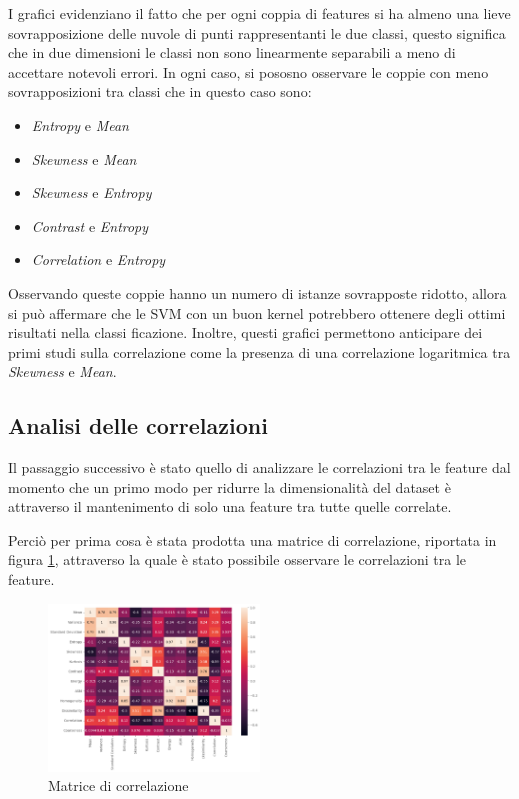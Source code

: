 I grafici evidenziano il fatto che per ogni coppia di features si ha almeno una lieve sovrapposizione
delle nuvole di punti rappresentanti le due classi, questo significa che in due 
dimensioni le classi non sono linearmente separabili a meno di accettare notevoli 
errori. In ogni caso, si pososno osservare le coppie con meno sovrapposizioni tra classi 
che in questo caso sono:
\begin{itemize}
      \item \textit{Entropy} e \textit{Mean}  
      \item \textit{Skewness} e \textit{Mean}  
      \item \textit{Skewness} e \textit{Entropy}  
      \item \textit{Contrast} e \textit{Entropy}  
      \item \textit{Correlation} e \textit{Entropy}  
\end{itemize} 
Osservando queste coppie hanno un numero di istanze sovrapposte ridotto, allora 
si può affermare che le SVM con un buon kernel potrebbero ottenere degli ottimi 
risultati nella classi ficazione.
Inoltre, questi grafici permettono anticipare dei primi studi sulla correlazione
come la presenza di una correlazione logaritmica tra \textit{Skewness} e \textit{Mean}.

\subsection{Analisi delle correlazioni}
Il passaggio successivo è  stato quello di analizzare le correlazioni tra le feature
dal momento che un primo modo per ridurre la dimensionalità del dataset è attraverso
il mantenimento di solo una feature tra tutte quelle correlate.

Perciò per prima cosa è stata prodotta una matrice di correlazione, riportata in figura
\ref{fig:corr-matrix}, attraverso la quale è stato possibile osservare le correlazioni
tra le feature.

\begin{figure}[!ht]
      \centering
      \includegraphics[width=0.5\textwidth]{img/analisi/corr.png}
      \caption{Matrice di correlazione}
      \label{fig:corr-matrix}
\end{figure}

